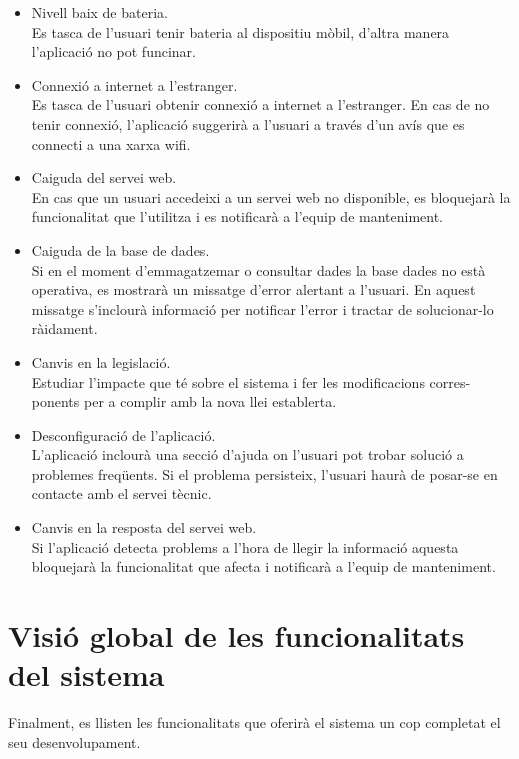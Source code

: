 \begin{itemize}

\item{}Nivell baix de bateria.\\
Es tasca de l’usuari tenir bateria al dispositiu mòbil, d’altra manera l’aplicació no pot funcinar.
\item{}Connexió a internet a l’estranger.\\
Es tasca de l’usuari obtenir connexió a internet a l’estranger. En cas de no tenir connexió, l’aplicació suggerirà a l’usuari a través d’un avís que es connecti a una xarxa wifi.
\item{}Caiguda del servei web.\\
En cas que un usuari accedeixi a un servei web no disponible, es bloquejarà la funcionalitat que l’utilitza i es notificarà a l’equip de manteniment.
\item{}Caiguda de la base de dades.\\
Si en el moment d’emmagatzemar o consultar dades la base dades no està
operativa, es mostrarà un missatge d’error alertant a l’usuari. En aquest
missatge s’inclourà informació per notificar l’error i tractar de solucionar-lo ràidament.
\item{}Canvis en la legislació.\\
Estudiar l’impacte que té sobre el sistema i fer les modificacions corres-
ponents per a complir amb la nova llei establerta.
\item{}Desconfiguració de l’aplicació.\\
L’aplicació inclourà una secció d’ajuda on l’usuari pot trobar solució a
problemes freqüents. Si el problema persisteix, l’usuari haurà de posar-se
en contacte amb el servei tècnic.
\item{}Canvis en la resposta del servei web.\\
Si l’aplicació detecta problems a l’hora de llegir la informació aquesta bloquejarà la funcionalitat que afecta i notificarà a l’equip de manteniment.
\end{itemize}

\section{Visió global de les funcionalitats del sistema}
Finalment, es llisten les funcionalitats que oferirà el sistema un cop completat el seu desenvolupament.


